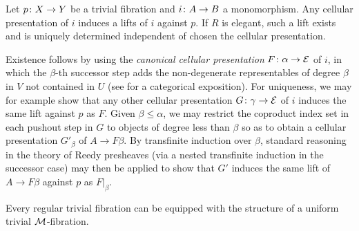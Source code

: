\documentclass[reqno,10pt,a4paper,oneside,draft]{amsart}
\begin{document}
\begin{remark} \label{elegant-reedy-lift-independent-of-cellular-presentation}
Let $p \co X \to Y$ be a trivial fibration and $i \co A \to B$ a monomorphism.
Any cellular presentation of $i$ induces a lifts of $i$ against $p$.
If $R$ is elegant, such a lift exists and is uniquely determined independent of chosen the cellular presentation.

Existence follows by using the \emph{canonical cellular presentation} $F \co \alpha \to \cal{E}$ of $i$, in which the $\beta$-th successor step adds the non-degenerate representables of degree $\beta$ in $V$ not contained in $U$ (see \cite{riehl-verity:reedy} for a categorical exposition).
For uniqueness, we may for example show that any other cellular presentation $G \co \gamma \to \cal{E}$ of $i$ induces the same lift against $p$ as $F$.
Given $\beta \leq \alpha$, we may restrict the coproduct index set in each pushout step in $G$ to objects of degree less than $\beta$ so as to obtain a cellular presentation $G'_\beta$ of $A \to F \beta$.
By transfinite induction over $\beta$, standard reasoning in the theory of Reedy presheaves (via a nested transfinite induction in the successor case) may then be applied to show that $G'$ induces the same lift of $A \to F \beta$ against $p$ as $F|_{\beta}$.
\end{remark}

\begin{proposition} \label{regular-trivial-fibration-to-uniform}
Every regular trivial fibration can be equipped with the structure of a uniform trivial $\cal{M}$-fibration.
\end{proposition}
\end{document}
